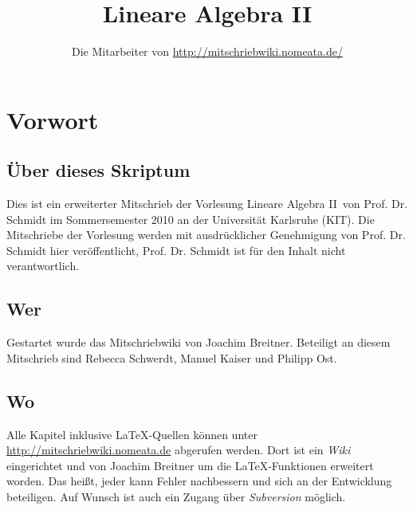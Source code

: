 \documentclass[parskip,a4paper,twoside,DIV15,BCOR12mm]{scrbook}
\author{Die Mitarbeiter von \url{http://mitschriebwiki.nomeata.de/}}
\title{Lineare Algebra II}
\begin{document}
\maketitle

\renewcommand{\thechapter}{\Roman{chapter}}

\tableofcontents

\chapter{Vorwort}

\section{Über dieses Skriptum}
Dies ist ein erweiterter Mitschrieb der Vorlesung \glqq Lineare Algebra II\grqq\ von Prof. Dr. Schmidt im
Sommersemester 2010 an der Universität Karlsruhe (KIT). Die Mitschriebe der Vorlesung werden mit
ausdrücklicher Genehmigung von Prof. Dr. Schmidt hier veröffentlicht, Prof. Dr. Schmidt ist für den
Inhalt nicht verantwortlich.

\section{Wer}
Gestartet wurde das Mitschriebwiki von Joachim Breitner. Beteiligt an diesem Mitschrieb sind
Rebecca Schwerdt, Manuel Kaiser und Philipp Ost.

\section{Wo}
Alle Kapitel inklusive \LaTeX-Quellen können unter \url{http://mitschriebwiki.nomeata.de} abgerufen werden.
Dort ist ein \emph{Wiki} eingerichtet und von Joachim Breitner um die \LaTeX-Funktionen erweitert worden.
Das heißt, jeder kann Fehler nachbessern und sich an der Entwicklung
beteiligen. Auf Wunsch ist auch ein Zugang über \emph{Subversion} möglich.


\renewcommand{\thechapter}{\arabic{chapter}}
\renewcommand{\chaptername}{§}
\setcounter{chapter}{13}
\end{document}
